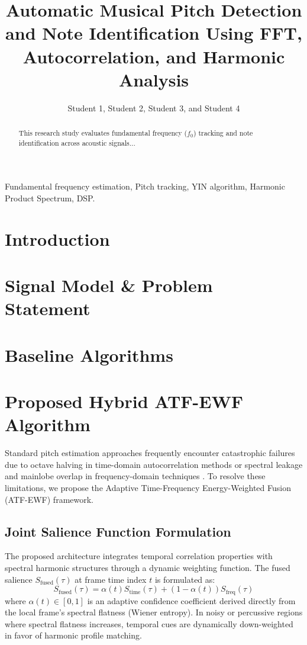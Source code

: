 \documentclass[journal]{IEEEtran}
\begin{document}
\title{Automatic Musical Pitch Detection and Note Identification Using FFT, Autocorrelation, and Harmonic Analysis}

\author{Student 1, Student 2, Student 3, and Student 4}

\maketitle

\begin{abstract}
This research study evaluates fundamental frequency ($f_0$) tracking and note identification across acoustic signals...
\end{abstract}

\begin{IEEEkeywords}
Fundamental frequency estimation, Pitch tracking, YIN algorithm, Harmonic Product Spectrum, DSP.
\end{IEEEkeywords}

\section{Introduction}
\section{Signal Model \& Problem Statement}
\section{Baseline Algorithms}

\section{Proposed Hybrid ATF-EWF Algorithm}
\label{sec:proposed}

Standard pitch estimation approaches frequently encounter catastrophic failures due to octave halving in time-domain autocorrelation methods or spectral leakage and mainlobe overlap in frequency-domain techniques \cite{decheveigne2002yin, schroeder1968hps}. To resolve these limitations, we propose the Adaptive Time-Frequency Energy-Weighted Fusion (ATF-EWF) framework.

\subsection{Joint Salience Function Formulation}
The proposed architecture integrates temporal correlation properties with spectral harmonic structures through a dynamic weighting function. The fused salience $S_{\text{fused}}(\tau)$ at frame time index $t$ is formulated as:
\begin{equation}
S_{\text{fused}}(\tau)
=
\alpha(t)S_{\text{time}}(\tau)
+
\left(1-\alpha(t)\right)S_{\text{freq}}(\tau)
\end{equation}
where $\alpha(t) \in [0, 1]$ is an adaptive confidence coefficient derived directly from the local frame's spectral flatness (Wiener entropy). In noisy or percussive regions where spectral flatness increases, temporal cues are dynamically down-weighted in favor of harmonic profile matching.
\end{document}
